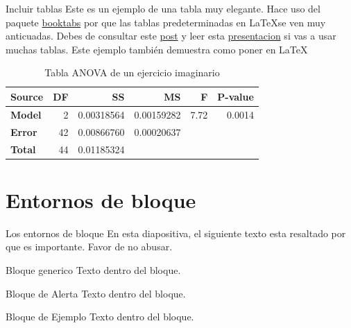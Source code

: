 \begin{frame}{Incluir tablas}
Este es un ejemplo de una tabla muy elegante.
Hace uso del paquete \href{https://ctan.org/pkg/booktabs}{booktabs} por que las tablas predeterminadas en \LaTeX se ven muy anticuadas.
Debes de consultar este \href{https://jdhao.github.io/2019/08/27/latex_table_with_booktabs/}{post} y leer esta \href{https://people.inf.ethz.ch/markusp/teaching/guides/guide-tables.pdf}{presentacion} si vas a usar muchas tablas.
Este ejemplo también demuestra como poner  en \LaTeX{}
\begin{table}[htb]
  \begin{center}
    \begin{tabular}{l | r r r r r}
      \toprule
      Source & \textbf{DF} & \textbf{SS} & \textbf{MS} & \textbf{F} & \textbf{P-value} \\
      \midrule
      \textbf{Model} & 2 & 0.00318564 & 0.00159282 & 7.72 & 0.0014 \\
      \textbf{Error} & 42 & 0.00866760 & 0.00020637 &  & \\
      \midrule
      \textbf{Total} & 44 & 0.01185324 &   &  & \\
      \bottomrule
    \end{tabular}
  \end{center}
\caption{Tabla ANOVA de un ejercicio imaginario}
\end{table}
\end{frame}

\section{Entornos de bloque}
\begin{frame}{Los entornos de bloque}
En esta diapositiva, el siguiente texto esta
\alert{resaltado} por que es importante.
Favor de no abusar.
    \begin{block}{Bloque generico}
        Texto dentro del bloque.
    \end{block}

    \begin{alertblock}{Bloque de Alerta}
        Texto dentro del bloque.
    \end{alertblock}

    \begin{exampleblock}{Bloque de Ejemplo}
        Texto dentro del bloque.
    \end{exampleblock}   
\end{frame}


